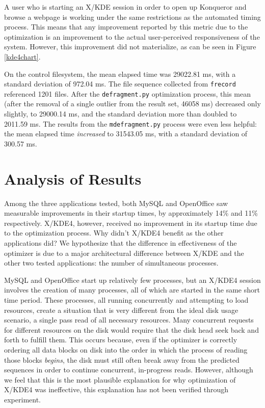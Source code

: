 \documentclass[10pt,twocolumn,letterpaper]{article}
\begin{document}
A user who is starting an X/KDE session in order to open up Konqueror and browse a webpage is working under the same restrictions as the automated timing process. This means that any improvement reported by this metric due to the optimization is an improvement to the actual user-perceived responsiveness of the system. However, this improvement
did not materialize, as can be seen in Figure \ref{kde4chart}.

On the control filesystem, the mean elapsed time was 29022.81 ms, with a standard deviation of 972.04 ms. The file sequence collected from \texttt{frecord} referenced 1201 files. After the \texttt{defragment.py} optimization process, this mean (after the removal of a single outlier from the result set, 46058 ms) decreased only slightly, to 29000.14 ms, and the standard deviation more than doubled to 2011.59 ms. The results from the \texttt{mdefragment.py} process were even less helpful: the mean elapsed time \emph{increased} to 31543.05 ms, with a standard deviation of 300.57 ms.

\section{Analysis of Results}

Among the three applications tested, both MySQL and OpenOffice saw measurable improvements in their startup times, by approximately 14\% and 11\% respectively. X/KDE4, however, received no improvement in its startup time due to the optimization process. Why didn't X/KDE4 benefit as the other applications did? We hypothesize that the difference in effectiveness of the optimizer is due to a major architectural difference between X/KDE and the other two tested applications: the number of simultaneous processes.

MySQL and OpenOffice start up relatively few processes, but an X/KDE4 session involves the creation of many processes, all of which are started in the same short time period. These processes, all running concurrently and attempting to load resources, create a situation that is very different from the ideal disk usage scenario, a single pass read of all necessary resources. Many concurrent requests for different resources on the disk would require that the disk head seek back and forth to fulfill them. This occurs because, even if the optimizer is correctly ordering all data blocks on disk into the order in which the process of reading those blocks \emph{begins}, the disk must still often break away from the predicted sequences in order to continue concurrent, in-progress reads. However, although we feel that this is the most plausible explanation for why optimization of X/KDE4 was ineffective, this explanation has not been verified through experiment.
\end{document}
